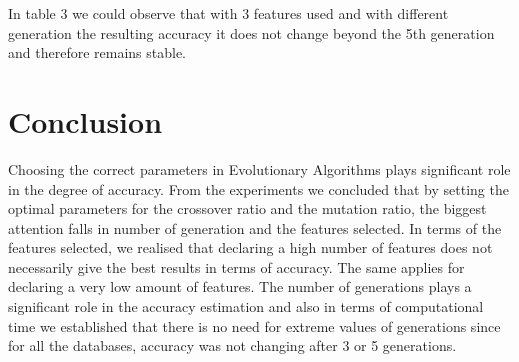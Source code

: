 \documentclass[11pt,onecolumn,a4paper]{article}
\begin{document}
 \begin{table}[ht]
 \caption{Red Wine Varying Generations, 3 Features}
 
 \end{table}
 In table 3 we could observe that with 3 features used and with different generation the resulting accuracy it does not change beyond the 5th generation and therefore remains stable.

\section{Conclusion}
Choosing the correct parameters in Evolutionary Algorithms plays significant role in the degree of accuracy. From the experiments we concluded that by setting the optimal parameters for the crossover ratio and the mutation ratio, the biggest attention falls in number of generation and the features selected. In terms of the features selected, we realised that declaring a high number of features does not necessarily give the best results in terms of accuracy. The same applies for declaring a very low amount of features. The number of generations plays a significant role in the accuracy estimation and also in terms of computational time we established that there is no need for extreme values of generations since for all the databases, accuracy was not changing after 3 or 5 generations.   




\newpage


{\small


}
\end{document}
